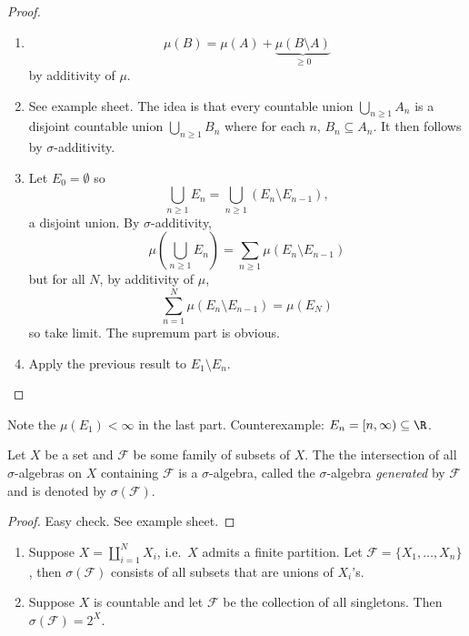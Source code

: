 \documentclass[a4paper]{article}
\begin{document}
\begin{proof}\leavevmode
  \begin{enumerate}
  \item
    \[
      \mu(B) = \mu(A) + \underbrace{\mu(B \setminus A)}_{\geq 0}
    \]
    by additivity of \(\mu\).
  \item See example sheet. The idea is that every countable union \(\bigcup_{n \geq 1} A_n\) is a disjoint countable union \(\bigcup_{n \geq 1} B_n\) where for each \(n\), \(B_n \subseteq A_n\). It then follows by \(\sigma\)-additivity.
  \item Let \(E_0 = \emptyset\) so
    \[
      \bigcup_{n \geq 1} E_n = \bigcup_{n \geq 1} (E_n \setminus E_{n - 1}),
    \]
    a disjoint union. By \(\sigma\)-additivity,
    \[
      \mu(\bigcup_{n \geq 1} E_n) = \sum_{n \geq 1} \mu(E_n \setminus E_{n - 1})
    \]
    but for all \(N\), by additivity of \(\mu\),
    \[
      \sum_{n = 1}^N \mu(E_n \setminus E_{n - 1}) = \mu(E_N)
    \]
    so take limit. The supremum part is obvious.
  \item Apply the previous result to \(E_1 \setminus E_n\).
  \end{enumerate}
\end{proof}

\begin{remark}
  Note the \(\mu(E_1) < \infty\) in the last part. Counterexample: \(E_n = [n, \infty) \subseteq \R\).
\end{remark}

\begin{definition}
  Let \(X\) be a set and \(\mathcal F\) be some family of subsets of \(X\). The the intersection of all \(\sigma\)-algebras on \(X\) containing \(\mathcal F\) is a \(\sigma\)-algebra, called the \(\sigma\)-algebra \emph{generated} by \(\mathcal F\) and is denoted by \(\sigma(\mathcal F)\).
\end{definition}

\begin{proof}
  Easy check. See example sheet.
\end{proof}

\begin{eg}\leavevmode
  \begin{enumerate}
  \item Suppose \(X = \coprod_{i = 1}^N X_i\), i.e.\ \(X\) admits a finite partition. Let \(\mathcal F = \{X_1, \dots, X_n\}\), then \(\sigma(\mathcal F)\) consists of all subsets that are unions of \(X_i\)'s.
  \item Suppose \(X\) is countable and let \(\mathcal F\) be the collection of all singletons. Then \(\sigma(\mathcal F) = 2^X\).
  \end{enumerate}
\end{eg}
\end{document}
